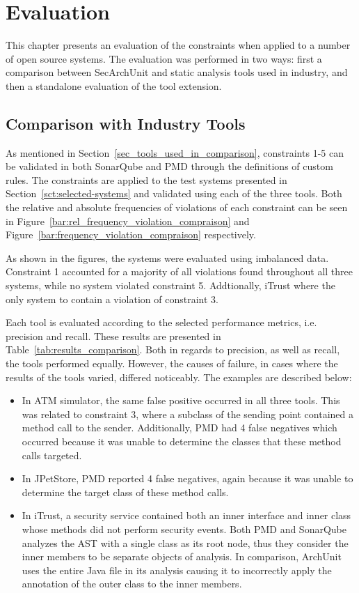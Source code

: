\chapter{Evaluation}

This chapter presents an evaluation of the constraints when applied to a number of open source systems. The evaluation was performed in two ways: first a comparison between SecArchUnit and static analysis tools used in industry, and then a standalone evaluation of the tool extension.

\section{Comparison with Industry Tools}
As mentioned in Section~\ref{sec_tools_used_in_comparison}, constraints 1-5 can be validated in both SonarQube and PMD through the definitions of custom rules. The constraints are applied to the test systems presented in Section~\ref{sct:selected-systems} and validated using each of the three tools. Both the relative and absolute frequencies of violations of each constraint can be seen in Figure~\ref{bar:rel_frequency_violation_compraison} and Figure~\ref{bar:frequency_violation_compraison} respectively.




As shown in the figures, the systems were evaluated using imbalanced data. Constraint 1 accounted for a majority of all violations found throughout all three systems, while no system violated constraint 5. Addtionally, iTrust where the only system to contain a violation of constraint 3. 

Each tool is evaluated according to the selected performance metrics, i.e. precision and recall. These results are presented in Table~\ref{tab:results_comparison}. Both in regards to precision, as well as recall, the tools performed equally. However, the causes of failure, in cases where the results of the tools varied, differed noticeably. The examples are described below:

\begin{itemize}
    \item In ATM simulator, the same false positive occurred in all three tools. This was related to constraint 3, where a subclass of the sending point contained a method call to the sender. Additionally, PMD had 4 false negatives which occurred because it was unable to determine the classes that these method calls targeted.
    \item In JPetStore, PMD reported 4 false negatives, again because it was unable to determine the target class of these method calls.
    \item In iTrust, a security service contained both an inner interface and inner class whose methods did not perform security events. Both PMD and SonarQube analyzes the AST with a single class as its root node, thus they consider the inner members to be separate objects of analysis. In comparison, ArchUnit uses the entire Java file in its analysis causing it to incorrectly apply the annotation of the outer class to the inner members. 
\end{itemize}

